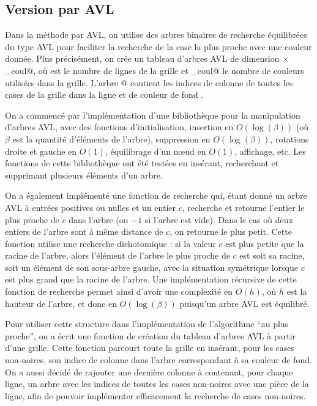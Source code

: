 \documentclass[a4paper,12pt]{article}
\numberwithin{equation}{section}
\begin{document}
\subsection{Version par AVL}
\label{SecAVL}

Dans la méthode par AVL, on utilise des arbres binaires de recherche équilibrées du type AVL pour faciliter la recherche de la case la plus proche avec une couleur donnée. Plus précisément, on crée un tableau \verb@M@ d'arbres AVL de dimension \verb@m@ $\times$ \verb@nb_coul@, où \verb@m@ est le nombre de lignes de la grille et \verb@nb_coul@ le nombre de couleurs utilisées dans la grille. L'arbre \verb@M[i][c]@ contient les indices de colonne \verb@j@ de toutes les cases de la grille dans la ligne \verb@i@ et de couleur de fond \verb@c@.

On a commencé par l'implémentation d'une bibliothèque pour la manipulation d'arbres AVL, avec des fonctions d'initialisation, insertion en $O(\log(\beta))$ (où $\beta$ est la quantité d'éléments de l'arbre), suppression en $O(\log(\beta))$, rotations droite et gauche en $O(1)$, équilibrage d'un n\oe{}ud en $O(1)$, affichage, etc. Les fonctions de cette bibliothèque ont été testées en insérant, recherchant et supprimant plusieurs éléments d'un arbre.

On a également implémenté une fonction de recherche qui, étant donné un arbre AVL à entrées positives ou nulles et un entier $c$, recherche et retourne l'entier le plus proche de $c$ dans l'arbre (ou $-1$ si l'arbre est vide). Dans le cas où deux entiers de l'arbre sont à même distance de $c$, on retourne le plus petit. Cette fonction utilise une recherche dichotomique : si la valeur $c$ est plus petite que la racine de l'arbre, alors l'élément de l'arbre le plus proche de $c$ est soit sa racine, soit un élément de son sous-arbre gauche, avec la situation symétrique lorsque $c$ est plus grand que la racine de l'arbre. Une implémentation récursive de cette fonction de recherche permet ainsi d'avoir une complexité en $O(h)$, où $h$ est la hauteur de l'arbre, et donc en $O(\log(\beta))$ puisqu'un arbre AVL est équilibré.

Pour utiliser cette structure dans l'implémentation de l'algorithme ``au plus proche'', on a écrit une fonction de création du tableau d'arbres AVL \verb@M@ à partir d'une grille. Cette fonction parcourt toute la grille en insérant, pour les cases non-noires, son indice de colonne dans l'arbre correspondant à sa couleur de fond. On a aussi décidé de rajouter une dernière colonne à \verb@M@ contenant, pour chaque ligne, un arbre avec les indices de toutes les cases non-noires avec une pièce de la ligne, afin de pouvoir implémenter efficacement la recherche de cases non-noires.
\end{document}
